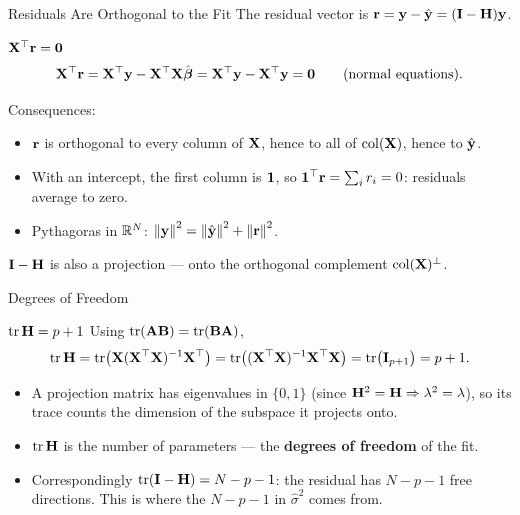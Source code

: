 \documentclass[11pt,aspectratio=169]{beamer}
\begin{document}
\begin{frame}{Residuals Are Orthogonal to the Fit}
The residual vector is $\mathbf{r}=\mathbf{y}-\hat{\mathbf{y}}=(\mathbf{I}-\mathbf{H})\mathbf{y}$.
\begin{derivation}{$\mathbf{X}^{\top}\mathbf{r}=\mathbf{0}$}
\[
\mathbf{X}^{\top}\mathbf{r}=\mathbf{X}^{\top}\mathbf{y}-\mathbf{X}^{\top}\mathbf{X}\hat{\boldsymbol{\beta}}=\mathbf{X}^{\top}\mathbf{y}-\mathbf{X}^{\top}\mathbf{y}=\mathbf{0}
\qquad\text{(normal equations)}.
\]
\end{derivation}
Consequences:
\begin{itemize}
  \item $\mathbf{r}$ is orthogonal to every column of $\mathbf{X}$, hence to all of $\operatorname{col}(\mathbf{X})$, hence to $\hat{\mathbf{y}}$.
  \item With an intercept, the first column is $\mathbf{1}$, so $\mathbf{1}^{\top}\mathbf{r}=\sum_i r_i=0$: residuals average to zero.
  \item Pythagoras in $\mathbb{R}^N$: \quad $\left\lVert \mathbf{y} \right\rVert^2=\left\lVert \hat{\mathbf{y}} \right\rVert^2+\left\lVert \mathbf{r} \right\rVert^2$.
\end{itemize}
\begin{keypoint}
$\mathbf{I}-\mathbf{H}$ is also a projection --- onto the orthogonal complement $\operatorname{col}(\mathbf{X})^\perp$.
\end{keypoint}
\end{frame}

\begin{frame}{Degrees of Freedom}
\begin{claim}{$\operatorname{tr}\mathbf{H}=p+1$}
Using $\operatorname{tr}(\mathbf{A}\mathbf{B})=\operatorname{tr}(\mathbf{B}\mathbf{A})$,
\[
\operatorname{tr}\mathbf{H}=\operatorname{tr}\bigl(\mathbf{X}(\mathbf{X}^{\top}\mathbf{X})^{-1}\mathbf{X}^{\top}\bigr)=\operatorname{tr}\bigl((\mathbf{X}^{\top}\mathbf{X})^{-1}\mathbf{X}^{\top}\mathbf{X}\bigr)=\operatorname{tr}\bigl(\mathbf{I}_{p+1}\bigr)=p+1 .
\]
\end{claim}
\begin{itemize}
  \item A projection matrix has eigenvalues in $\{0,1\}$ (since $\mathbf{H}^2=\mathbf{H}\Rightarrow\lambda^2=\lambda$), so its
        trace counts the dimension of the subspace it projects onto.
  \item $\operatorname{tr}\mathbf{H}$ is the number of parameters --- the \textbf{degrees of freedom} of the fit.
  \item Correspondingly $\operatorname{tr}(\mathbf{I}-\mathbf{H})=N-p-1$: the residual has $N-p-1$ free directions.
        This is where the $N-p-1$ in $\hat\sigma^2$ comes from.
\end{itemize}
\end{frame}

\end{document}
